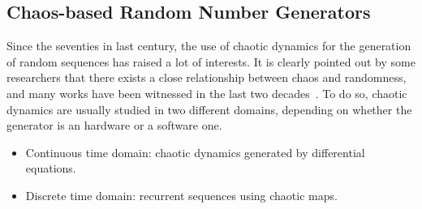 %
%
%
%


\subsection{Chaos-based Random Number Generators}

Since the seventies in last century, the use of chaotic dynamics for the generation of random sequences has raised a lot of interests. It is clearly pointed out by some researchers that there exists a close relationship between chaos and randomness, and many works have been witnessed in the last two decades~\cite{Provenzale199231}.
To do so, chaotic dynamics are usually studied in two different domains, depending on whether the generator is an hardware or a software one.
\begin{itemize}
 \item Continuous time domain: chaotic dynamics generated by differential equations.
 \item Discrete time domain: recurrent sequences using chaotic maps.
\end{itemize}

